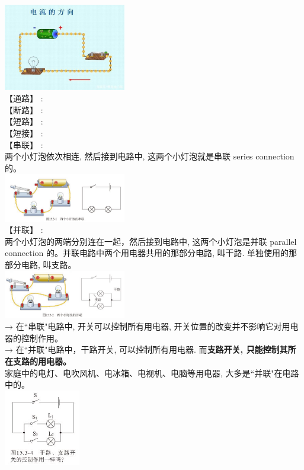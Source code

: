 \documentclass[UTF8]{ctexart}
\begin{document}
	\includegraphics[width=0.4\textwidth]{img/0052.png} \\
	
	
	【通路】 : \\
	【断路】 : \\
	【短路】 : \\
	【短接】 : \\
	
	
	【串联】 : \\
	两个小灯泡依次相连, 然后接到电路中, 这两个小灯泡就是串联 series connection 的。 \\
	
	\includegraphics[width=0.4\textwidth]{img/0053.png} \\			
	
	【并联】 : \\
	两个小灯泡的两端分别连在一起，然后接到电路中, 这两个小灯泡是并联 parallel  connection 的。并联电路中两个用电器共用的那部分电路, 叫干路. 单独使用的那部分电路, 叫支路。 \\
	
	\includegraphics[width=0.4\textwidth]{img/0054.png} \\
	
	
	→ 在``串联"电路中, 开关可以控制所有用电器, 开关位置的改变并不影响它对用电器的控制作用。 \\
	→ 在``并联"电路中，干路开关, 可以控制所有用电器. 而\textbf{支路开关, 只能控制其所在支路的用电器。} \\
	家庭中的电灯、电吹风机、电冰箱、电视机、电脑等用电器, 大多是``并联"在电路中的。 \\	
	
	\includegraphics[width=0.25\textwidth]{img/0055.png} \\	
	
\end{document}
